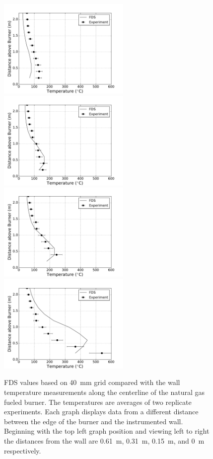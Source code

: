 \documentclass[twoside]{uocthesis}
\begin{document}
\begin{figure}[ht!]
  \centering
  \includegraphics[width=2.5in]{../Figures/IWGB_NG_TC_Surface_Center_Avg_2D}
  \includegraphics[width=2.5in]{../Figures/IWGB_NG_TC_Surface_Center_Avg_1D}\\
  \includegraphics[width=2.5in]{../Figures/IWGB_NG_TC_Surface_Center_Avg_0p5D}
  \includegraphics[width=2.5in]{../Figures/IWGB_NG_TC_Surface_Center_Avg_0D}\\
  \caption[FDS values based on 40~mm grid compared with the wall temperature measurements along the centerline of the natural gas fueled burner]{FDS values based on 40~mm grid compared with the wall temperature measurements along the centerline of the natural gas fueled burner. The temperatures are averages of two replicate experiments. Each graph displays data from a different distance between the edge of the burner and the instrumented wall.  Beginning with the top left graph position and viewing left to right the distances from the wall are 0.61~m, 0.31~m, 0.15~m, and 0~m respectively.}
  \label{FDS_TCSurface_IWGB_comp}
\end{figure}
\end{document}
